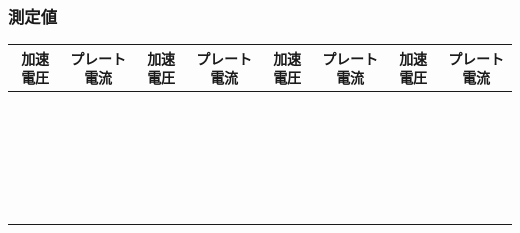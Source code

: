 \subsubsection*{測定値}
\hspace*{-\parindent}
\begin{tabular}{|c|c||c|c||c|c||c|c|}
\hline
\scriptsize 加速電圧 & \scriptsize プレート電流 & \scriptsize 加速電圧 & \scriptsize プレート電流 & \scriptsize 加速電圧 & \scriptsize プレート電流 & \scriptsize 加速電圧 & \scriptsize プレート電流 \\
\hline\hline
\hspace*{1.6cm}&\hspace*{1.6cm}&\hspace*{1.6cm}&\hspace*{1.6cm}&\hspace*{1.6cm}&\hspace*{1.6cm}&\hspace*{1.6cm}&\hspace*{1.6cm}\\
\hline
&&&&&&&\\
\hline
&&&&&&&\\
\hline
&&&&&&&\\
\hline
&&&&&&&\\
\hline
&&&&&&&\\
\hline
&&&&&&&\\
\hline
&&&&&&&\\
\hline
&&&&&&&\\
\hline
&&&&&&&\\
\hline
&&&&&&&\\
\hline
&&&&&&&\\
\hline
&&&&&&&\\
\hline
&&&&&&&\\
\hline
&&&&&&&\\
\hline
&&&&&&&\\
\hline
&&&&&&&\\
\hline
&&&&&&&\\
\hline
&&&&&&&\\
\hline
&&&&&&&\\
\hline
&&&&&&&\\
\hline
&&&&&&&\\
\hline
&&&&&&&\\
\hline
&&&&&&&\\
\hline
&&&&&&&\\
\hline
\end{tabular}


